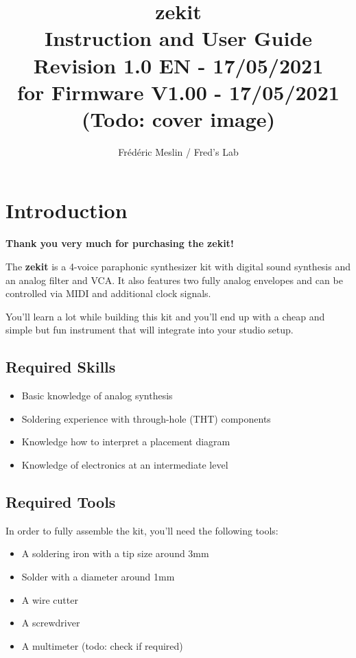 \documentclass{scrartcl}
\title{
    \vspace*{4cm}
    \huge{zekit} \\
    Instruction and User Guide \\
    \vspace*{0.25cm}
    \small{Revision 1.0 EN - 17/05/2021} \\
    \small{for Firmware V1.00 - 17/05/2021} \\
    \vspace*{0.5cm}
    (Todo: cover image)
}
\author{Frédéric Meslin / Fred's Lab}
\begin{document}
\maketitle

\pagebreak


\tableofcontents
\pagebreak


\section{Introduction}

\textbf{Thank you very much for purchasing the zekit!}

The \textbf{zekit} is a 4-voice paraphonic synthesizer kit with digital sound synthesis and an analog filter and VCA. It also features two fully analog envelopes and can be controlled via MIDI and additional clock signals.

You'll learn a lot while building this kit and you'll end up with a cheap and simple but fun instrument that will integrate into your studio setup.

\subsection{Required Skills}

\begin{itemize}
    \item Basic knowledge of analog synthesis
    \item Soldering experience with through-hole (THT) components
    \item Knowledge how to interpret a placement diagram
    \item Knowledge of electronics at an intermediate level
\end{itemize}

\subsection{Required Tools}

In order to fully assemble the kit, you'll need the following tools:

\begin{itemize}
    \item A soldering iron with a tip size around 3mm
    \item Solder with a diameter around 1mm
    \item A wire cutter
    \item A screwdriver
    \item A multimeter (todo: check if required)
\end{itemize}
\end{document}
